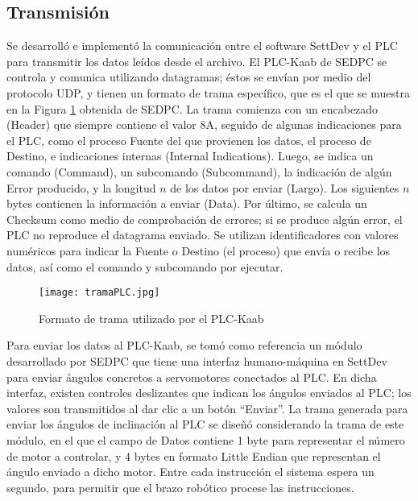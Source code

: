 \subsection{Transmisión}

Se desarrolló e implementó la comunicación entre el software SettDev y el PLC para transmitir los datos leídos desde el archivo. El PLC-Kaab de SEDPC se controla y comunica utilizando datagramas; éstos se envían por medio del protocolo UDP, y tienen un formato de trama específico, que es el que se muestra en la Figura \ref{fig:tramaPLC} obtenida de SEDPC. La trama comienza con un encabezado (Header) que siempre contiene el valor 8A, seguido de algunas indicaciones para el PLC, como el proceso Fuente del que provienen los datos, el proceso de Destino, e indicaciones internas (Internal Indications). Luego, se indica un comando (Command), un subcomando (Subcommand), la indicación de algún Error producido, y la longitud $n$ de los datos por enviar (Largo). Los siguientes $n$ bytes contienen la información a enviar (Data). Por último, se calcula un Checksum como medio de comprobación de errores; si se produce algún error, el PLC no reproduce el datagrama enviado. Se utilizan identificadores con valores numéricos para indicar la Fuente o Destino (el proceso) que envía o recibe los datos, así como el comando y subcomando por ejecutar.

\begin{figure}[htb]
	\centering
	\texttt{[image: tramaPLC.jpg]}
	\caption{Formato de trama utilizado por el PLC-Kaab}
	\label{fig:tramaPLC}
\end{figure}

Para enviar los datos al PLC-Kaab, se tomó como referencia  un módulo desarrollado por SEDPC que tiene una interfaz humano-máquina en SettDev para enviar ángulos concretos a servomotores conectados al PLC. En dicha interfaz, existen controles deslizantes que indican los ángulos enviados al PLC; los valores son transmitidos al dar clic a un botón ``Enviar''. La trama generada para enviar los ángulos de inclinación al PLC se diseñó considerando la trama de este módulo, en el que el campo de Datos contiene 1 byte para representar el número de motor a controlar, y 4 bytes en formato Little Endian que representan el ángulo enviado a dicho motor. Entre cada instrucción el sistema espera un segundo, para permitir que el brazo robótico procese las instrucciones.